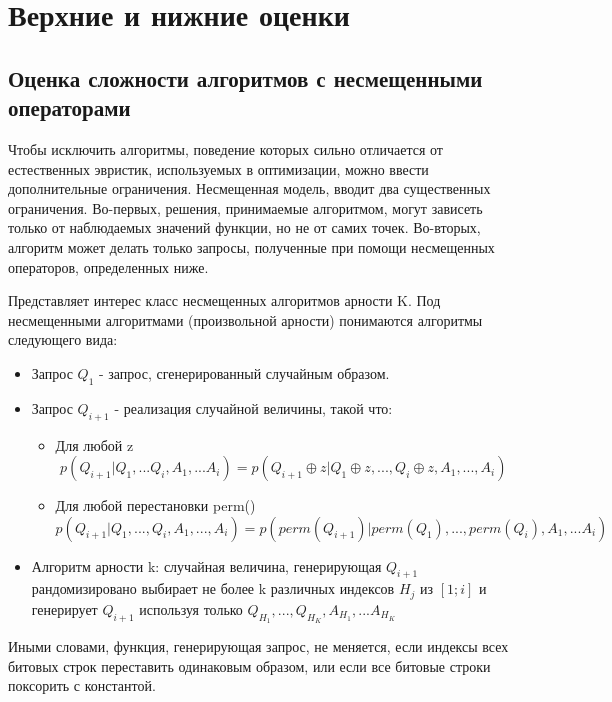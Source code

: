\chapter{Верхние и нижние оценки}
\label{chapter3}

\section{Оценка сложности алгоритмов с несмещенными операторами}

Чтобы исключить алгоритмы, поведение которых сильно отличается от естественных эвристик, используемых в оптимизации, можно ввести
дополнительные ограничения. Несмещенная модель,
вводит два существенных ограничения. Во-первых, решения, принимаемые алгоритмом, могут зависеть только от наблюдаемых значений функции, но не от самих точек. Во-вторых, алгоритм может делать только запросы,
полученные при помощи несмещенных операторов, определенных ниже.

Представляет интерес класс несмещенных алгоритмов арности K. Под
несмещенными алгоритмами (произвольной арности) понимаются алгоритмы
следующего вида:

\begin{itemize}
   \item Запрос $Q_1$ - запрос, сгенерированный случайным образом.
   \item Запрос $Q_{i+1}$ - реализация случайной величины, такой что:
        \begin{itemize}
            
            \item  Для любой z $$ p(Q_{i+1} | Q_1, ... Q_i, A_1, ... A_i) = p(Q_{i+1} \oplus z | Q_1 \oplus z, ..., Q_i \oplus z, A_1, ..., A_i)$$  
            
            \item Для любой перестановки perm() 
            $  p(Q_{i+1} | Q_1, ..., Q_i, A_1, ..., A_i) = p(perm(Q_{i+1}) |perm(Q_1), ..., perm(Q_i), A_1, ... A_i) $ 
            
        \end{itemize}

 \item Алгоритм арности k: случайная величина, генерирующая $Q_{i+1}$ рандомизировано выбирает не более k различных индексов $H_j$ из $[1; i]$ и генерирует $Q_{i+1}$ используя только $Q_{H_1}, ..., Q_{H_K}, A_{H_1}, ... A_{H_K}$
  \end{itemize}
  
  
Иными словами, функция, генерирующая запрос, не меняется, если индексы
всех битовых строк переставить одинаковым образом, или если все
битовые строки поксорить с константой.


